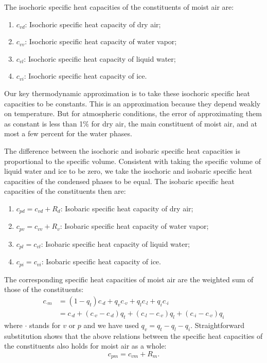 \documentclass{report}
\begin{document}
The isochoric specific heat capacities of the constituents of moist air are:
\begin{enumerate}
    \item $c_{vd}$: Isochoric specific heat capacity of dry air;
    \item $c_{vv}$: Isochoric specific heat capacity of water vapor;
    \item $c_{vl}$: Isochoric specific heat capacity of liquid water;
    \item $c_{vi}$: Isochoric specific heat capacity of ice.
\end{enumerate}
Our key thermodynamic approximation is to take these isochoric specific heat capacities to be constants. This is an approximation because they depend weakly on temperature. But for atmospheric conditions, the error of approximating them as constant is less than 1\% for dry air, the main constituent of moist air, and at most a few percent for the water phases.

The difference between the isochoric and isobaric specific heat capacities is proportional to the specific volume. Consistent with taking the specific volume of liquid water and ice to be zero, we take the isochoric and isobaric specific heat capacities of the condensed phases to be equal. The isobaric specific heat capacities of the constituents then are:
\begin{enumerate}
    \item $c_{pd} = c_{vd} + R_d$: Isobaric specific heat capacity of dry air;
    \item $c_{pv} = c_{vv} + R_v$: Isobaric specific heat capacity of water vapor;
    \item $c_{pl} = c_{vl}$: Isobaric specific heat capacity of liquid water;
    \item $c_{pi} = c_{vi}$: Isobaric specific heat capacity of ice.
\end{enumerate}

The corresponding specific heat capacities of moist air are the weighted sum of those of the constituents:
\begin{align}
    c_{\cdot m} & = (1-q_t) c_{\cdot d} + q_v c_{\cdot v} + q_l c_{\cdot l} + q_i c_{\cdot i} \label{e:specific_heat}\\
    & = c_{\cdot d} + (c_{\cdot v} - c_{\cdot d})q_t + (c_{\cdot l} - c_{\cdot v})q_l + (c_{\cdot i} - c_{\cdot v})q_i
\end{align}
where $\cdot$ stands for $v$ or $p$ and we have used $q_v = q_t -q_l - q_i$. Straightforward substitution shows that the above relations between the specific heat capacities of the constituents also holds for moist air as a whole:
\begin{equation}\label{e:specific_heat_relation}
    c_{pm} = c_{vm} + R_m.
\end{equation}
\end{document}
